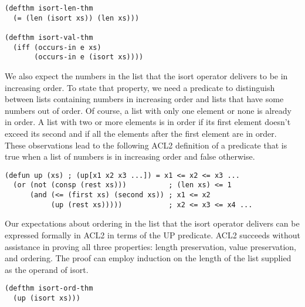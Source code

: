 \label{defthm:isort-len}
\label{defthm:isort-val}
\begin{Verbatim}
(defthm isort-len-thm
  (= (len (isort xs)) (len xs)))

(defthm isort-val-thm
  (iff (occurs-in e xs)
       (occurs-in e (isort xs))))
\end{Verbatim}

We also expect the numbers in the list that the isort operator
delivers to be in increasing order.
To state that property, we need a predicate
to distinguish between lists containing numbers in increasing order
and lists that have some numbers out of order.
Of course, a list with only one element or none is already in order.
A list with two or more elements is in order
if its first element doesn't exceed its second and if
all the elements after the first element are in order.
These observations lead to the following
ACL2 definition of a predicate that is true when a list
of numbers is in increasing order and false otherwise.

\label{defun:up}
\begin{Verbatim}
(defun up (xs) ; (up[x1 x2 x3 ...]) = x1 <= x2 <= x3 ...
  (or (not (consp (rest xs)))          ; (len xs) <= 1
      (and (<= (first xs) (second xs)) ; x1 <= x2
           (up (rest xs)))))           ; x2 <= x3 <= x4 ...
\end{Verbatim}

Our expectations about ordering in the list that the isort operator
delivers can be expressed formally in ACL2 in terms of the UP predicate.
ACL2 succeeds without assistance in proving
all three properties: length preservation,
value preservation, and ordering.
The proof can employ induction on the length
of the list supplied as the operand of isort.

\label{defthm:isort-ord-thm}
\begin{Verbatim}
(defthm isort-ord-thm
  (up (isort xs)))
\end{Verbatim}

